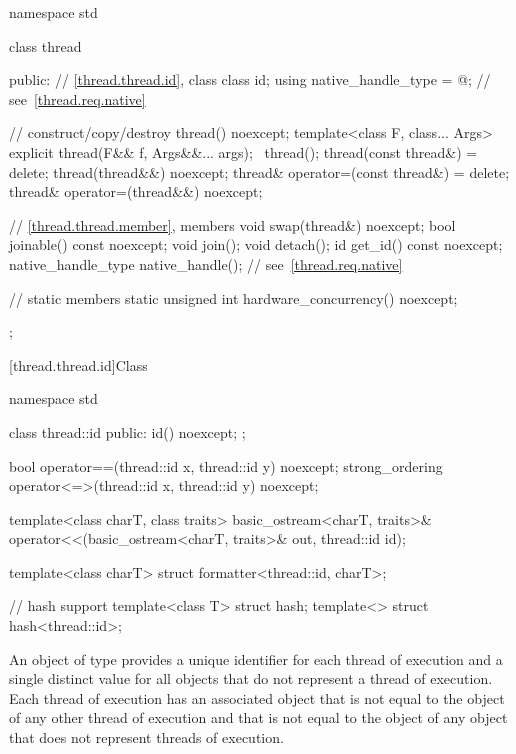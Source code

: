 %
\begin{codeblock}
namespace std {
  class thread {
  public:
    // \ref{thread.thread.id}, class 
    class id;
    using native_handle_type = @\impdefnc@;         // see~\ref{thread.req.native}

    // construct/copy/destroy
    thread() noexcept;
    template<class F, class... Args> explicit thread(F&& f, Args&&... args);
    ~thread();
    thread(const thread&) = delete;
    thread(thread&&) noexcept;
    thread& operator=(const thread&) = delete;
    thread& operator=(thread&&) noexcept;

    // \ref{thread.thread.member}, members
    void swap(thread&) noexcept;
    bool joinable() const noexcept;
    void join();
    void detach();
    id get_id() const noexcept;
    native_handle_type native_handle();                         // see~\ref{thread.req.native}

    // static members
    static unsigned int hardware_concurrency() noexcept;
  };
}
\end{codeblock}

[thread.thread.id]{Class }

%
%
\begin{codeblock}
namespace std {
  class thread::id {
  public:
    id() noexcept;
  };

  bool operator==(thread::id x, thread::id y) noexcept;
  strong_ordering operator<=>(thread::id x, thread::id y) noexcept;

  template<class charT, class traits>
    basic_ostream<charT, traits>&
      operator<<(basic_ostream<charT, traits>& out, thread::id id);

  template<class charT> struct formatter<thread::id, charT>;

  // hash support
  template<class T> struct hash;
  template<> struct hash<thread::id>;
}
\end{codeblock}

\pnum
An object of type  provides a unique identifier for
each thread of execution and a single distinct value for all 
objects that do not represent a thread of
execution. Each thread of execution has an
associated  object that is not equal to the
 object of any other thread of execution and that is not
equal to the  object of any  object that
does not represent threads of execution.

